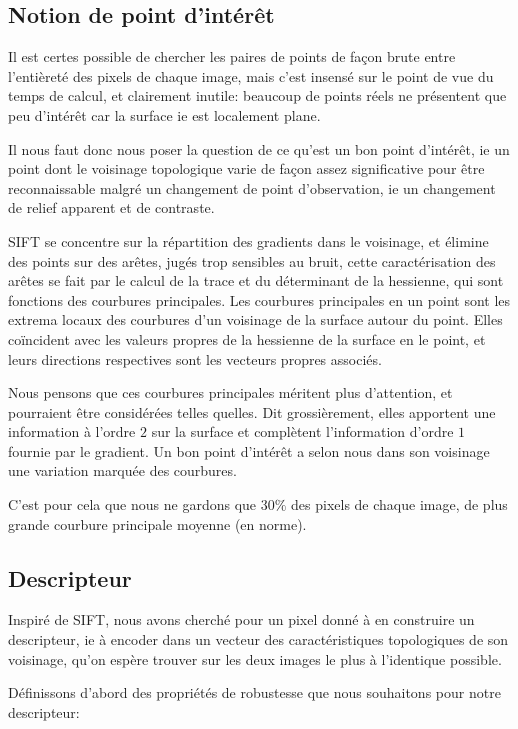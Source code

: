 \documentclass[
	a4paper, %
	10pt, %
	unnumberedsections, %
	twoside, %
]{LTJournalArticle}
\begin{document}
\subsection{Notion de point d'intérêt}

Il est certes possible de chercher les paires de points de façon brute entre
l'entièreté des pixels de chaque image, mais c'est insensé sur le
point de vue du temps de calcul, et clairement inutile: beaucoup de
points réels ne présentent que peu d'intérêt car la surface ie est
localement plane.

Il nous faut donc nous poser la question de ce qu'est un bon point
d'intérêt, ie un point dont le voisinage topologique varie de façon
assez significative pour être reconnaissable malgré un changement de
point d'observation, ie un changement de relief apparent et de contraste.

SIFT se concentre sur la répartition des gradients
dans le voisinage, et élimine des points sur des arêtes, jugés trop
sensibles au bruit, cette caractérisation des arêtes se fait par
le calcul de la trace et du déterminant de la hessienne,
qui sont fonctions des courbures principales.
Les courbures principales en un point sont les extrema locaux des courbures d'un voisinage de la surface
autour du point. Elles
coïncident avec les valeurs propres de la hessienne de la surface en le point,
et leurs directions respectives sont les vecteurs propres associés.

Nous pensons que ces courbures principales méritent plus d'attention,
et pourraient être considérées telles quelles. Dit grossièrement,
elles apportent une information à l'ordre $2$ sur la surface et complètent
l'information d'ordre $1$ fournie par le gradient. Un bon
point d'intérêt a selon nous dans son voisinage une variation marquée des courbures.


C'est pour cela que nous ne gardons que $30 \%$ des pixels de chaque image,
de plus grande courbure principale moyenne (en norme).

\subsection{Descripteur}
Inspiré de SIFT, nous avons cherché pour un pixel donné à en construire un descripteur,
ie à encoder dans un vecteur des caractéristiques topologiques de son voisinage, qu'on espère trouver
sur les deux images le plus à l'identique possible.

Définissons d'abord des propriétés de robustesse
que nous souhaitons pour notre descripteur:
\end{document}
